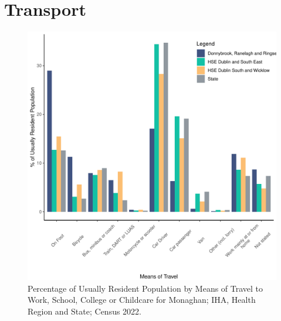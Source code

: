 \documentclass{article}
\begin{document}
\section{Transport}\label{sect:Trans}
\begin{figure}[H]
	\centering
	\includegraphics[width = 120mm]{../figures/TravelED.pdf}
	\caption{Percentage of Usually Resident Population by Means of Travel to Work, School, College or Childcare for Monaghan; IHA, Health Region and State; Census 2022.}
	\label{fig:vbnv}
	\end{figure}
\end{document}

